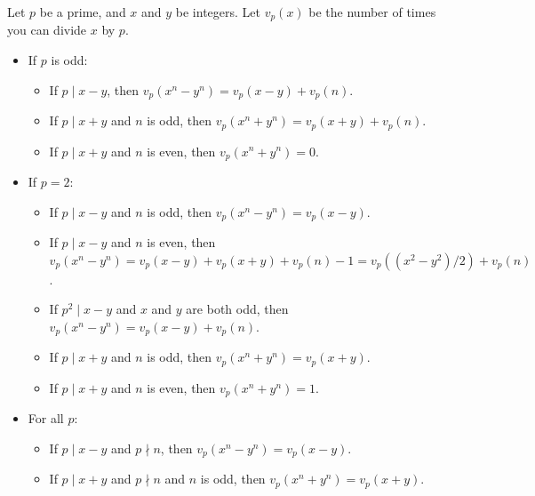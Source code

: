 Let $p$ be a prime, and $x$ and $y$ be integers. Let $v_p(x)$ be the number of times you can divide $x$ by $p$.
\begin{itemize}
	\item If $p$ is odd:
	\begin{itemize}
		\item If $p \mid x-y$, then $v_p(x^n - y^n) = v_p(x-y) + v_p(n)$.
		\item If $p \mid x+y$ and $n$ is odd, then $v_p(x^n + y^n) = v_p(x+y) + v_p(n)$.
		\item If $p \mid x+y$ and $n$ is even, then $v_p(x^n + y^n) = 0$.
	\end{itemize}
	\item If $p = 2$:
	\begin{itemize}
		\item If $p \mid x-y$ and $n$ is odd, then $v_p(x^n - y^n) = v_p(x-y)$.
		\item If $p \mid x-y$ and $n$ is even, then $v_p(x^n - y^n) = v_p(x-y) + v_p(x+y) + v_p(n) - 1 = v_p((x^2 - y^2)/2) + v_p(n)$.
		\item If $p^2 \mid x-y$ and $x$ and $y$ are both odd, then $v_p(x^n - y^n) = v_p(x-y) + v_p(n)$.
		\item If $p \mid x+y$ and $n$ is odd, then $v_p(x^n + y^n) = v_p(x+y)$.
		\item If $p \mid x+y$ and $n$ is even, then $v_p(x^n + y^n) = 1$.
	\end{itemize}
	\item For all $p$:
	\begin{itemize}
		\item If $p \mid x-y$ and $p \nmid n$, then $v_p(x^n - y^n) = v_p(x-y)$.
		\item If $p \mid x+y$ and $p \nmid n$ and $n$ is odd, then $v_p(x^n + y^n) = v_p(x+y)$.
	\end{itemize}
\end{itemize}